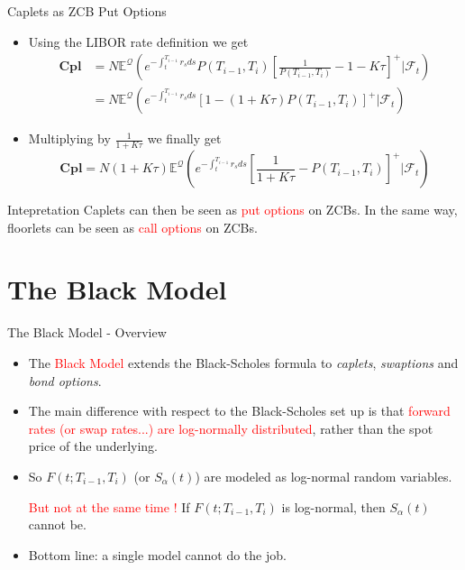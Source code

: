 \documentclass{beamer}
\begin{document}
\begin{frame}{Caplets as ZCB Put Options}
	\begin{itemize}
		\item<1-> Using the LIBOR rate definition we get
		\begin{equation*}
			\begin{aligned}
				\textbf{Cpl} &=N\mathbb{E}^{\mathcal{Q}}\left(e^{-\int_t^{T_{i-1}}r_s ds}P(T_{i-1},T_i)\left[\frac{1}{P(T_{i-1},T_i)}-1-K\tau\right]^+ \Big\rvert \mathcal{F}_t\right) \\
				& = 		N\mathbb{E}^{\mathcal{Q}}\left(e^{-\int_t^{T_{i-1}}r_s ds}\left[1-(1+K\tau)P(T_{i-1},T_i)\right]^+ | \mathcal{F}_t\right)
			\end{aligned}
		\end{equation*}
		\item<2-> Multiplying by $\frac{1}{1+K\tau}$ we finally get
		\begin{equation}
			\textbf{Cpl}=N(1+K\tau)\mathbb{E}^{\mathcal{Q}}\left(e^{-\int_t^{T_{i-1}}r_s ds}\left[\frac{1}{1+K\tau}-P(T_{i-1},T_i)\right]^+ \Big\rvert \mathcal{F}_t\right)
		\end{equation}
	\end{itemize}
	\begin{block}{Intepretation}
	Caplets can then be seen as \textcolor{red}{put options} on ZCBs. In the same way, floorlets can be seen as \textcolor{red}{call options} on ZCBs.
	\end{block}
\end{frame}

\section{The Black Model}
\begin{frame}{The Black Model - Overview}
	\begin{itemize}
		\item The \textcolor{red}{Black Model} extends the Black-Scholes formula to \emph{caplets}, \emph{swaptions} and \emph{bond options}. %
		\item The main difference with respect to the Black-Scholes set up is that \textcolor{red}{forward rates (or swap rates...) are log-normally distributed}, rather than the spot price of the underlying.
		\item So $F(t;T_{i-1},T_i)$ (or $S_\alpha(t)$) are modeled as log-normal random variables. 
		
		\textcolor{red}{But not at the same time !} If $F(t;T_{i-1},T_i)$ is log-normal, then $S_\alpha(t)$ cannot be.
		\item Bottom line: a single model cannot do the job.
	\end{itemize}
\end{frame}
\end{document}
